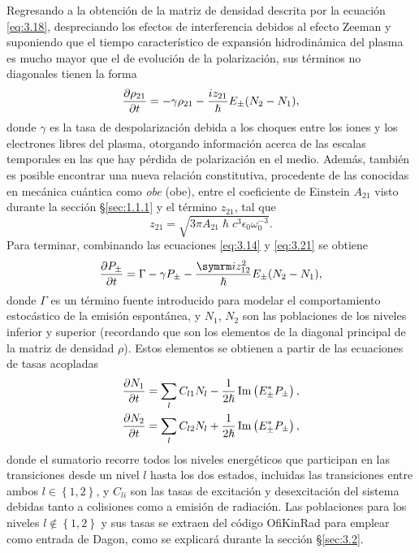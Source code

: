 Regresando a la obtención de la matriz de densidad descrita por la ecuación \eqref{eq:3.18}, despreciando los efectos de interferencia debidos al efecto Zeeman y suponiendo que el tiempo característico de expansión hidrodinámica del plasma es mucho mayor que el de evolución de la polarización, sus términos no diagonales tienen la forma \autocite{Sureau1995}
\begin{equation}\label{eq:3.21}
  \frac{\partial\rho_{21}}{\partial t} = -\gamma \rho_{21} - \frac{iz_{21}}{\hslash }E_{\pm }(N_{2}-N_{1}),
\end{equation}
donde $\gamma$ es la tasa de despolarización debida a los choques entre los iones y los electrones libres del plasma, otorgando información acerca de las escalas temporales en las que hay pérdida de polarización en el medio. Además, también es posible encontrar una nueva relación constitutiva, procedente de las conocidas en mecánica cuántica como \emph{\acrlong{obe}} (\acrshort{obe})\autocite{cohen-tannoudjiQuantumMechanicsVolume2019b}, entre el coeficiente de Einstein $A_{21}$ visto durante la sección \S\ref{sec:1.1.1} y el término $z_{21}$, tal que 
\begin{equation}\label{eq:3.21}
  z_{21} = \sqrt{3 \pi A_{21} \hslash c^{3} \epsilon_{0}\omega^{-3}_{0}}.
\end{equation}
Para terminar, combinando las ecuaciones \eqref{eq:3.14} y \eqref{eq:3.21} se obtiene 
\begin{equation}\label{eq:3.22}
  \pdv{P_{\pm }}{t} = \Gamma - \gamma P_{\pm } - \frac{\iu z^{2}_{12}}{\hslash }E_{\pm }(N_{2}-N_{1}),
\end{equation}
donde $\Gamma$ es un término fuente introducido \autocite{Oliva2012} para modelar el comportamiento estocástico de la emisión espontánea, y $N_{1}$, $N_{2}$ son las poblaciones de los niveles inferior y superior (recordando que son los elementos de la diagonal principal de la matriz de densidad $\rho$). Estos elementos se obtienen a partir de las ecuaciones de tasas acopladas 
\begin{align}
  \label{eq:3.23}
  \frac{\partial N_{1}}{\partial t} &= \sum_{l} C_{l1}N_{l} - \frac{1}{2 \hslash }\operatorname{Im} \left(E_{\pm }^{*}P_{\pm }\right), \\
  \label{eq:3.24}
  \frac{\partial N_{2}}{\partial t} &= \sum_{l} C_{l2}N_{l} + \frac{1}{2 \hslash }\operatorname{Im} \left(E_{\pm }^{*}P_{\pm }\right),
\end{align}
donde el sumatorio recorre todos los niveles energéticos que participan en las transiciones desde un nivel $l$ hasta los dos estados, incluidas las transiciones entre ambos $l \in \left\{1, 2\right\}$, y $C_{li}$ son las tasas de excitación y desexcitación del sistema debidas tanto a colisiones como a emisión de radiación. Las poblaciones para los niveles $l \notin \left\{1,2\right\}$ y sus tasas se extraen del código OfiKinRad para emplear como entrada de Dagon, como se explicará durante la sección \S\ref{sec:3.2}.

